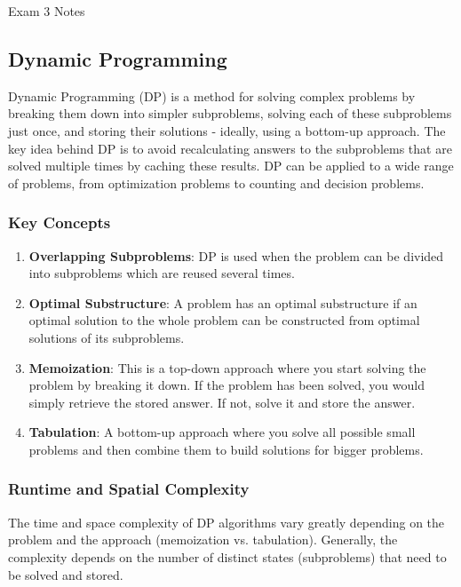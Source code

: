 \begin{examnotes}{Exam 3 Notes}
    \subsection*{Dynamic Programming}

    Dynamic Programming (DP) is a method for solving complex problems by breaking them down into simpler subproblems, solving each of these subproblems just once, and storing their solutions - ideally, 
    using a bottom-up approach. The key idea behind DP is to avoid recalculating answers to the subproblems that are solved multiple times by caching these results. DP can be applied to a wide range of 
    problems, from optimization problems to counting and decision problems.

    \subsubsection*{Key Concepts}

    \begin{enumerate}
        \item \textbf{Overlapping Subproblems}: DP is used when the problem can be divided into subproblems which are reused several times.
        \item \textbf{Optimal Substructure}: A problem has an optimal substructure if an optimal solution to the whole problem can be constructed from optimal solutions of its subproblems.
        \item \textbf{Memoization}: This is a top-down approach where you start solving the problem by breaking it down. If the problem has been solved, you would simply retrieve the stored answer. 
        If not, solve it and store the answer.
        \item \textbf{Tabulation}: A bottom-up approach where you solve all possible small problems and then combine them to build solutions for bigger problems.
    \end{enumerate}

    \subsubsection*{Runtime and Spatial Complexity}

    The time and space complexity of DP algorithms vary greatly depending on the problem and the approach (memoization vs. tabulation). Generally, the complexity depends on the number of distinct 
    states (subproblems) that need to be solved and stored.
    

\end{examnotes}
